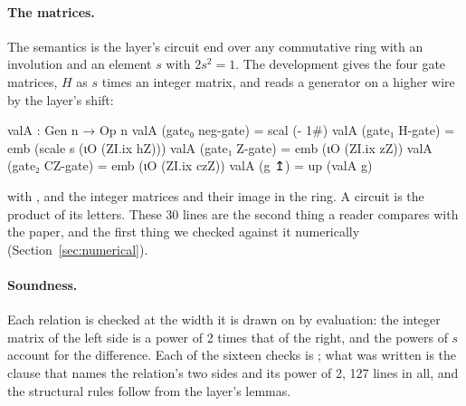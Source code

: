 \paragraph{The matrices.} The semantics is the layer's circuit end over
any commutative ring with an involution and an element $s$ with
$2s^2=1$. The development gives the four gate matrices, $H$ as $s$
times an integer matrix, and reads a generator on a higher wire by the
layer's shift:
\begin{agdacode}
valA : Gen n → Op n
valA (gate₀ neg-gate) = scal (- 1#)
valA (gate₁ H-gate)   = emb (scale s (ιO (ZI.ix hZ)))
valA (gate₁ Z-gate)   = emb (ιO (ZI.ix zZ))
valA (gate₂ CZ-gate)  = emb (ιO (ZI.ix czZ))
valA (g ↥)            = up (valA g)
\end{agdacode}
with ,  and  the integer matrices and
 their image in the ring. A circuit is the product of its
letters. These 30 lines are the second thing a reader compares with
the paper, and the first thing we checked against it numerically
(Section~\ref{sec:numerical}).

\paragraph{Soundness.} Each relation is checked at the width it is
drawn on by evaluation: the integer matrix of the left side is a power
of 2 times that of the right, and the powers of $s$ account for the
difference. Each of the sixteen checks is ; what was written
is the clause that names the relation's two sides and its power of 2,
127 lines in all, and the structural rules follow from the layer's
lemmas.

